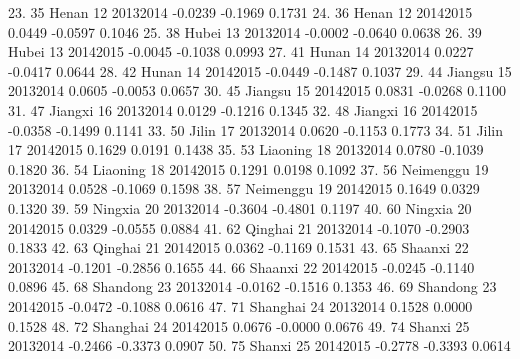  23. {\VBAR}  35          Henan   12   2013{\tytilde}2014   -0.0239   -0.1969   0.1731 {\VBAR}
 24. {\VBAR}  36          Henan   12   2014{\tytilde}2015    0.0449   -0.0597   0.1046 {\VBAR}
 25. {\VBAR}  38          Hubei   13   2013{\tytilde}2014   -0.0002   -0.0640   0.0638 {\VBAR}
 26. {\VBAR}  39          Hubei   13   2014{\tytilde}2015   -0.0045   -0.1038   0.0993 {\VBAR}
 27. {\VBAR}  41          Hunan   14   2013{\tytilde}2014    0.0227   -0.0417   0.0644 {\VBAR}
 28. {\VBAR}  42          Hunan   14   2014{\tytilde}2015   -0.0449   -0.1487   0.1037 {\VBAR}
 29. {\VBAR}  44        Jiangsu   15   2013{\tytilde}2014    0.0605   -0.0053   0.0657 {\VBAR}
 30. {\VBAR}  45        Jiangsu   15   2014{\tytilde}2015    0.0831   -0.0268   0.1100 {\VBAR}
 31. {\VBAR}  47        Jiangxi   16   2013{\tytilde}2014    0.0129   -0.1216   0.1345 {\VBAR}
 32. {\VBAR}  48        Jiangxi   16   2014{\tytilde}2015   -0.0358   -0.1499   0.1141 {\VBAR}
 33. {\VBAR}  50          Jilin   17   2013{\tytilde}2014    0.0620   -0.1153   0.1773 {\VBAR}
 34. {\VBAR}  51          Jilin   17   2014{\tytilde}2015    0.1629    0.0191   0.1438 {\VBAR}
 35. {\VBAR}  53       Liaoning   18   2013{\tytilde}2014    0.0780   -0.1039   0.1820 {\VBAR}
 36. {\VBAR}  54       Liaoning   18   2014{\tytilde}2015    0.1291    0.0198   0.1092 {\VBAR}
 37. {\VBAR}  56      Neimenggu   19   2013{\tytilde}2014    0.0528   -0.1069   0.1598 {\VBAR}
 38. {\VBAR}  57      Neimenggu   19   2014{\tytilde}2015    0.1649    0.0329   0.1320 {\VBAR}
 39. {\VBAR}  59        Ningxia   20   2013{\tytilde}2014   -0.3604   -0.4801   0.1197 {\VBAR}
 40. {\VBAR}  60        Ningxia   20   2014{\tytilde}2015    0.0329   -0.0555   0.0884 {\VBAR}
 41. {\VBAR}  62        Qinghai   21   2013{\tytilde}2014   -0.1070   -0.2903   0.1833 {\VBAR}
 42. {\VBAR}  63        Qinghai   21   2014{\tytilde}2015    0.0362   -0.1169   0.1531 {\VBAR}
 43. {\VBAR}  65        Shaanxi   22   2013{\tytilde}2014   -0.1201   -0.2856   0.1655 {\VBAR}
 44. {\VBAR}  66        Shaanxi   22   2014{\tytilde}2015   -0.0245   -0.1140   0.0896 {\VBAR}
 45. {\VBAR}  68       Shandong   23   2013{\tytilde}2014   -0.0162   -0.1516   0.1353 {\VBAR}
 46. {\VBAR}  69       Shandong   23   2014{\tytilde}2015   -0.0472   -0.1088   0.0616 {\VBAR}
 47. {\VBAR}  71       Shanghai   24   2013{\tytilde}2014    0.1528    0.0000   0.1528 {\VBAR}
 48. {\VBAR}  72       Shanghai   24   2014{\tytilde}2015    0.0676   -0.0000   0.0676 {\VBAR}
 49. {\VBAR}  74         Shanxi   25   2013{\tytilde}2014   -0.2466   -0.3373   0.0907 {\VBAR}
 50. {\VBAR}  75         Shanxi   25   2014{\tytilde}2015   -0.2778   -0.3393   0.0614 {\VBAR}
